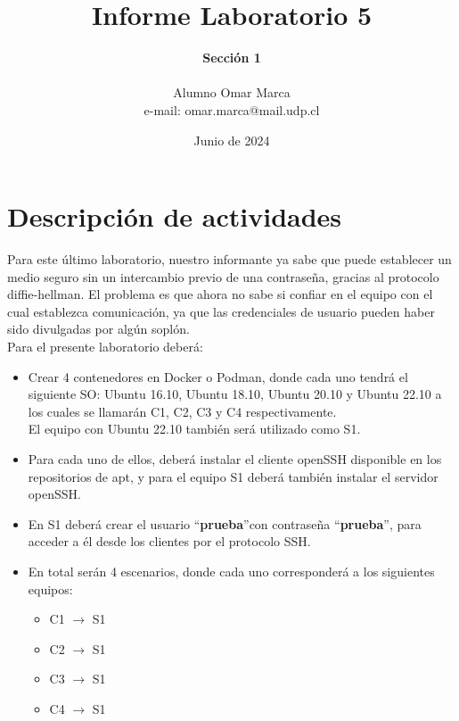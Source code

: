 \documentclass[letter,12pt]{article}
\begin{document}
%
   \title{\Huge{Informe Laboratorio 5}}

   \author{\textbf{Sección 1} \\  \\Alumno Omar Marca \\ e-mail: omar.marca@mail.udp.cl}
          
   \date{Junio de 2024}

   \maketitle

   \newpage
   
   \tableofcontents
 
  \newpage
  

\section*{Descripción de actividades}
Para este último laboratorio, nuestro informante ya sabe que puede establecer un medio seguro sin un intercambio previo de una contraseña, gracias al protocolo diffie-hellman. El problema es que ahora no sabe si confiar en el equipo con el cual establezca comunicación, ya que las credenciales de usuario pueden haber sido divulgadas por algún soplón.\\

Para el presente laboratorio deberá:

\begin{itemize}
    \item Crear 4 contenedores en Docker o Podman, donde cada uno tendrá el siguiente SO:
        Ubuntu 16.10, Ubuntu 18.10, Ubuntu 20.10 y Ubuntu 22.10 a los cuales se llamarán C1, C2, C3 y C4 respectivamente.\\
        El equipo con Ubuntu 22.10 también será utilizado como S1.
        
    \item  Para cada uno de ellos, deberá instalar el cliente openSSH disponible en los repositorios de apt, y para el equipo S1 deberá también instalar el servidor openSSH.

    \item En S1 deberá crear el usuario \textquotedblleft\textbf{prueba}\textquotedblright con contraseña \textquotedblleft\textbf{prueba}\textquotedblright, para acceder a él desde los clientes por el protocolo SSH.
    
    \item En total serán 4 escenarios, donde cada uno corresponderá a los siguientes equipos:
    \begin{itemize}
        \item C1 $\rightarrow$ S1
        \item C2 $\rightarrow$ S1
        \item C3 $\rightarrow$ S1
        \item C4 $\rightarrow$ S1
    \end{itemize}
\end{itemize}
\end{document}
